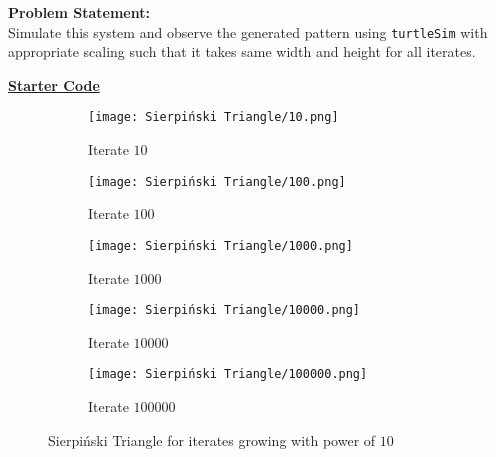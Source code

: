 \documentclass[../../Problems]{subfiles}
\begin{document}
\textbf{Problem Statement:}\\
Simulate this system and observe the generated pattern using \verb!turtleSim! with appropriate scaling such that it takes same width and height for all iterates.
\begin{tcolorbox}%
	\href{https://github.com/paramrathour/CS-101/blob/main/Starter%20Codes/Sierpi%C5%84ski%20Triangle.cpp}{\textbf{Starter Code}}
\end{tcolorbox}
\begin{figure}[H]
	\centering
	\begin{subfigure}{0.18\linewidth}
		\texttt{[image: Sierpiński Triangle/10.png]}
		\caption{Iterate $10$}
	\end{subfigure}
	\begin{subfigure}{0.18\linewidth}
		\texttt{[image: Sierpiński Triangle/100.png]}
		\caption{Iterate $100$}
	\end{subfigure}
	\begin{subfigure}{0.18\linewidth}
		\texttt{[image: Sierpiński Triangle/1000.png]}
		\caption{Iterate $1000$}
	\end{subfigure}
	\begin{subfigure}{0.18\linewidth}
		\texttt{[image: Sierpiński Triangle/10000.png]}
		\caption{Iterate $10000$}
	\end{subfigure}
	\begin{subfigure}{0.18\linewidth}
		\texttt{[image: Sierpiński Triangle/100000.png]}
		\caption{Iterate $100000$}
	\end{subfigure}
	\caption{Sierpi\'nski Triangle for iterates growing with power of $10$}
\end{figure}
\vspace{-2em}
\end{document}

